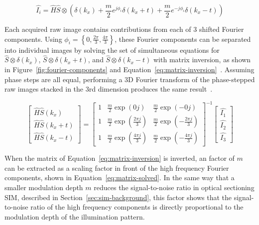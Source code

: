 \begin{equation} \label{eq:heintzmann-fourier}
\hat{I_i} = \hat{H} \hat{S} \otimes \left( \delta \left( k_x \right) + \frac{m}{2} e^{j\phi_i} \delta \left( k_x + t \right) + \frac{m}{2} e^{-j\phi_i} \delta \left( k_x - t \right) \right)
\end{equation}

Each acquired raw image contains contributions from each of 3 shifted Fourier components.
Using $\phi_i = \left\lbrace0, \frac{2\pi}{3}, \frac{4\pi}{3}\right\rbrace$, these Fourier components can be separated into individual images by solving the set of simultaneous equations for $\hat{S}\otimes\delta \left( k_x \right)$, $\hat{S}\otimes\delta \left( k_x + t \right)$, and $\hat{S}\otimes\delta \left( k_x - t \right)$ with matrix inversion, as shown in Figure~\ref{fig:fourier-components} and Equation~\ref{eq:matrix-inversion}~\cite{wicker2013phase}.
Assuming phase steps are all equal, performing a 3D Fourier transform of the phase-stepped raw images stacked in the 3rd dimension produces the same result~\cite{gustafsson2005nonlinear}.

\begin{equation} \label{eq:matrix-inversion}
\begin{bmatrix} \hat{H}\hat{S}\left(k_x\right) \\ \hat{H}\hat{S}\left(k_x+t\right) \\ \hat{H}\hat{S}\left(k_x-t\right) \end{bmatrix} =
\begin{bmatrix}
1 & \frac{m}{2}\exp\left(0j\right) & \frac{m}{2}\exp\left(-0j\right) \\
1 & \frac{m}{2}\exp\left(\frac{2\pi j}{3}\right) & \frac{m}{2}\exp\left(-\frac{2\pi j}{3}\right) \\
1 & \frac{m}{2}\exp\left(\frac{4\pi j}{3}\right) & \frac{m}{2}\exp\left(-\frac{4\pi j}{3}\right)
\end{bmatrix}^{-1}
\begin{bmatrix} \hat{I_1} \\ \hat{I_2} \\ \hat{I_3} \end{bmatrix}
\end{equation}

When the matrix of Equation~\ref{eq:matrix-inversion} is inverted, an factor of $m$ can be extracted as a scaling factor in front of the high frequency Fourier components, shown in Equation~\ref{eq:matrix-solved}.
In the same way that a smaller modulation depth $m$ reduces the signal-to-noise ratio in optical sectioning SIM, described in Section~\ref{sec:sim-background}, this factor shows that the signal-to-noise ratio of the high frequency components is directly proportional to the modulation depth of the illumination pattern.


